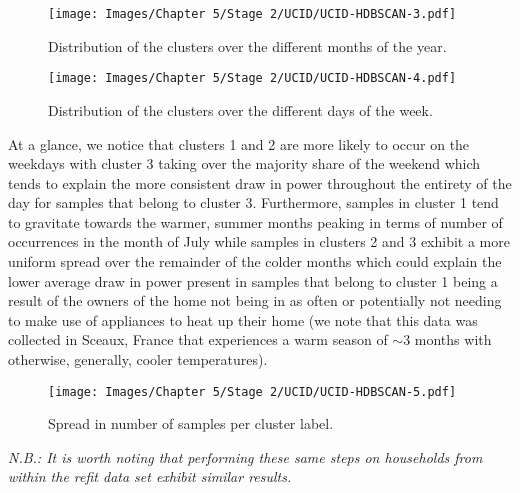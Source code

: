 \begin{adjustwidth}{-1.65cm}{-0.0cm}
\begin{enumerate}[label=Step 2.\arabic*:, leftmargin=*]
        \begin{figure}[H]
            \centering
            \texttt{[image: Images/Chapter 5/Stage 2/UCID/UCID-HDBSCAN-3.pdf]}
            \caption{Distribution of the clusters over the different months of the year.}
            \label{fig:UCID-HDBSCAN-3}
        \end{figure}
        
        \begin{figure}[H]
            \centering
            \texttt{[image: Images/Chapter 5/Stage 2/UCID/UCID-HDBSCAN-4.pdf]}
            \caption{Distribution of the clusters over the different days of the week.}
            \label{fig:UCID-HDBSCAN-4}
        \end{figure}
        
        \noindent \newline At a glance, we notice that clusters 1 and 2 are more likely to occur on the weekdays with cluster 3 taking over the majority share of the weekend which tends to explain the more consistent draw in power throughout the entirety of the day for samples that belong to cluster 3. Furthermore, samples in cluster 1 tend to gravitate towards the warmer, summer months peaking in terms of number of occurrences in the month of July while samples in clusters 2 and 3 exhibit a more uniform spread over the remainder of the colder months which could explain the lower average draw in power present in samples that belong to cluster 1 being a result of the owners of the home not being in as often or potentially not needing to make use of appliances to heat up their home (we note that this data was collected in Sceaux, France that experiences a warm season of $\sim \! 3$  months with otherwise, generally, cooler temperatures). 
        
        \begin{figure}[hbt!]
            \centering
            \texttt{[image: Images/Chapter 5/Stage 2/UCID/UCID-HDBSCAN-5.pdf]}
            \caption{Spread in number of samples per cluster label.}
            \label{fig:UCID-HDBSCAN-5}
        \end{figure}
        
        \noindent \newline \textit{N.B.: It is worth noting that performing these same steps on households from within the \gls{refit} data set exhibit similar results.}
    \end{enumerate}
\end{adjustwidth}

